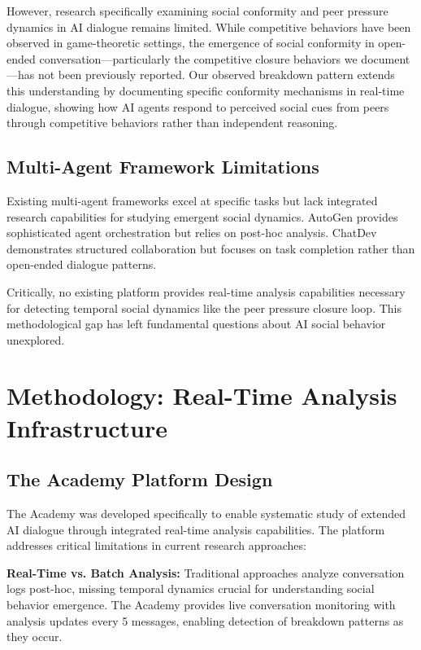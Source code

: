 \documentclass[11pt,letterpaper]{article}
\newcommand{\theacademy}{The Academy}
\begin{document}
However, research specifically examining social conformity and peer pressure dynamics in AI dialogue remains limited. While competitive behaviors have been observed in game-theoretic settings, the emergence of social conformity in open-ended conversation—particularly the competitive closure behaviors we document—has not been previously reported. Our observed breakdown pattern extends this understanding by documenting specific conformity mechanisms in real-time dialogue, showing how AI agents respond to perceived social cues from peers through competitive behaviors rather than independent reasoning.

\subsection{Multi-Agent Framework Limitations}

Existing multi-agent frameworks excel at specific tasks but lack integrated research capabilities for studying emergent social dynamics. AutoGen \citep{wu2023autogen} provides sophisticated agent orchestration but relies on post-hoc analysis. ChatDev \citep{qian2023chatdev} demonstrates structured collaboration but focuses on task completion rather than open-ended dialogue patterns.

Critically, no existing platform provides real-time analysis capabilities necessary for detecting temporal social dynamics like the peer pressure closure loop. This methodological gap has left fundamental questions about AI social behavior unexplored.

\section{Methodology: Real-Time Analysis Infrastructure}

\subsection{The Academy Platform Design}

\theacademy{} was developed specifically to enable systematic study of extended AI dialogue through integrated real-time analysis capabilities. The platform addresses critical limitations in current research approaches:

\textbf{Real-Time vs. Batch Analysis:} Traditional approaches analyze conversation logs post-hoc, missing temporal dynamics crucial for understanding social behavior emergence. \theacademy{} provides live conversation monitoring with analysis updates every 5 messages, enabling detection of breakdown patterns as they occur.
\end{document}
